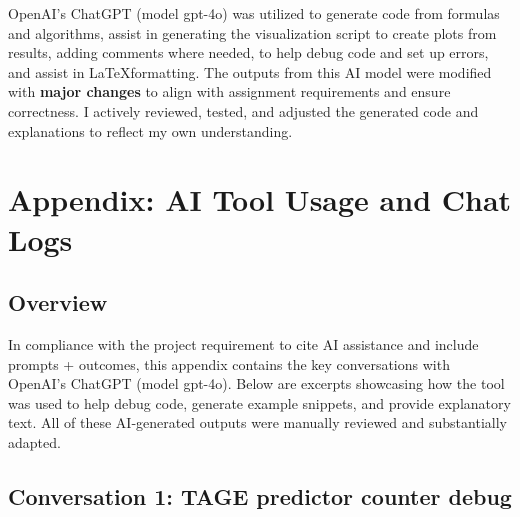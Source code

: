 \documentclass[sigconf, screen]{acmart}
\begin{document}
\begin{acks}
OpenAI's ChatGPT (model gpt-4o) was utilized to generate code from formulas and algorithms, assist in generating the visualization script to create plots from results, adding comments where needed, to help debug code and set up errors, and assist in \LaTeX formatting. The outputs from this AI model were modified with \textbf{major changes} to align with assignment requirements and ensure correctness. I actively reviewed, tested, and adjusted the generated code and explanations to reflect my own understanding.
\end{acks}





\appendix
\section{Appendix: AI Tool Usage and Chat Logs}

\subsection{Overview}
In compliance with the project requirement to cite AI assistance and include prompts + outcomes, this appendix contains the key conversations with OpenAI’s ChatGPT (model gpt-4o). Below are excerpts showcasing how the tool was used to help debug code, generate example snippets, and provide explanatory text. All of these AI‐generated outputs were manually reviewed and substantially adapted.

\onecolumn
\subsection{Conversation 1: TAGE predictor counter debug}
\end{document}
